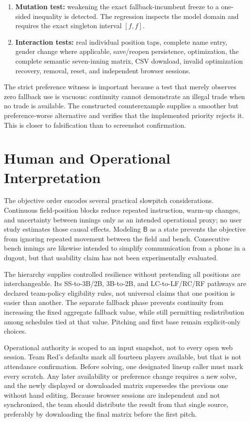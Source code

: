 \documentclass[11pt]{article}
\newcommand{\Bench}{\mathsf{B}}
\begin{document}
\begin{enumerate}
    imposing the exact constraint $f=f^{inc}$ before continuity search.
    \item \textbf{Mutation test:} weakening the exact fallback-incumbent freeze
    to a one-sided inequality is detected. The regression inspects the model
    domain and requires the exact singleton interval $[f,f]$.
    \item \textbf{Interaction tests:} real individual position taps, complete
    name entry, gender change where applicable, save/reopen persistence,
    optimization, the complete semantic seven-inning matrix, CSV download, invalid
    optimization recovery, removal, reset, and independent browser sessions.
\end{enumerate}

The strict preference witness is important because a test that merely observes
zero fallback use is vacuous: continuity cannot demonstrate an illegal trade
when no trade is available. The constructed counterexample supplies a smoother
but preference-worse alternative and verifies that the implemented priority
rejects it. This is closer to falsification than to screenshot confirmation.

\section{Human and Operational Interpretation}

The objective order encodes several practical slowpitch considerations.
Continuous field-position blocks reduce repeated instruction, warm-up changes,
and uncertainty between innings only as an intended operational proxy; no user
study estimates those causal effects. Modeling $\Bench$ as a state prevents the
objective from ignoring repeated movement between the field and bench.
Consecutive bench innings are likewise intended to simplify communication from
a phone in a dugout, but that usability claim has not been experimentally
evaluated.

The hierarchy supplies controlled resilience without pretending all positions
are interchangeable. Its SS-to-3B/2B, 3B-to-2B, and LC-to-LF/RC/RF pathways
are declared team-policy eligibility rules, not universal claims that one
position is easier than another. The separate fallback phase prevents
continuity from increasing the fixed aggregate fallback value, while still
permitting redistribution among schedules tied at that value. Pitching and
first base remain explicit-only choices.

Operational authority is scoped to an input snapshot, not to every open web
session. Team Red's defaults mark all fourteen players available, but that is
not attendance confirmation. Before solving, one designated lineup caller must
mark every scratch. Any later availability or preference change requires a new
solve, and the newly displayed or downloaded matrix supersedes the previous
one without hand editing. Because browser sessions are independent and not
synchronized, the team should distribute the result from that single source,
preferably by downloading the final matrix before the first pitch.
\end{document}
